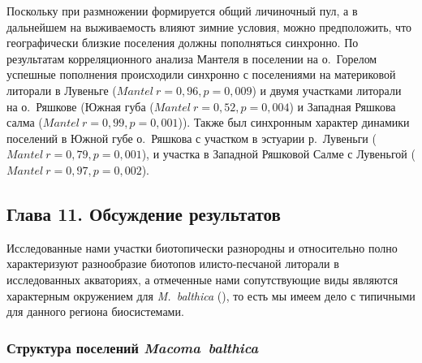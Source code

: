 {Поскольку при размножении формируется общий личиночный пул, а в дальнейшем на выживаемость влияют зимние условия, можно предположить, что географически близкие поселения должны пополняться синхронно.
По результатам корреляционного анализа Мантеля в поселении на о.~Горелом успешные пополнения происходили синхронно с поселениями на материковой литорали в Лувеньге ($Mantel\ r = 0,96, p = 0,009$) и двумя участками литорали на о.~Ряшкове (Южная губа ($Mantel\ r = 0,52, p = 0,004$) и Западная Ряшкова салма ($Mantel\ r = 0,99, p = 0,001$)).
Также был синхронным характер динамики поселений в Южной губе о.~Ряшкова с участком в эстуарии р.~Лувеньги ($Mantel\ r = 0,79, p = 0,001$), и участка в Западной Ряшковой Салме с Лувеньгой ($Mantel\ r = 0,97, p = 0,002$).

\subsection*{Глава 11. Обсуждение результатов}
Исследованные нами участки биотопически разнородны и относительно полно характеризуют разнообразие биотопов илисто-песчаной литорали в исследованных акваториях, а отмеченные нами сопутствующие виды являются характерным окружением для \textit{M.~balthica} (\cite{Derugin_1915, Guryanova_et_al_1928, Guryanova_Ushakov_1929, Guryanova_et_al_1930, Babkov_Golikov_1984, Naumov_Fedyakov_1993, Chertoprud_et_al_2004, Naumov_2006, Gerasimova_et_al_2010, Derevenschikov_Kravets_2010, Stolyarov_2010}), то есть мы имеем дело с типичными для данного региона биосистемами.

\subsubsection*{Структура поселений \textit{Macoma~balthica}}
}
